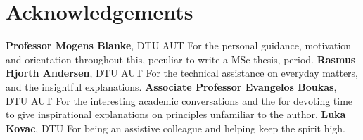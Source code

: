 \section*{Acknowledgements}
\textbf{Professor Mogens Blanke}, DTU AUT\newline
For the personal guidance, motivation and orientation throughout this, peculiar to write a MSc thesis, period.\newline
\textbf{Rasmus Hjorth Andersen}, DTU AUT\newline
For the technical assistance on everyday matters, and the insightful explanations.\newline
\textbf{Associate Professor Evangelos Boukas}, DTU AUT\newline
For the interesting academic conversations and the for devoting time to give inspirational explanations on principles unfamiliar to the author.\newline
\textbf{Luka Kovac}, DTU\newline
For being an assistive colleague and helping keep the spirit high.\newline
%


